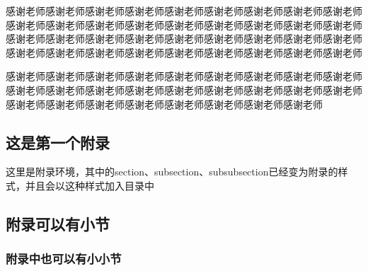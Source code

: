 \documentclass{HustGraduPaper}
\begin{document}
	\begin{thankpage}
		感谢老师感谢老师感谢老师感谢老师感谢老师感谢老师感谢老师感谢老师感谢老师感谢老师感谢老师感谢老师感谢老师感谢老师感谢老师感谢老师感谢老师感谢老师感谢老师感谢老师感谢老师感谢老师感谢老师感谢老师感谢老师感谢老师感谢老师感谢老师感谢老师感谢老师感谢老师感谢老师感谢老师感谢老师感谢老师感谢老师
		
		感谢老师感谢老师感谢老师感谢老师感谢老师感谢老师感谢老师感谢老师感谢老师感谢老师感谢老师感谢老师感谢老师感谢老师感谢老师感谢老师感谢老师感谢老师感谢老师感谢老师感谢老师感谢老师感谢老师感谢老师感谢老师感谢老师
	\end{thankpage}
	
	
	
	\begin{appendices}
		\section{这是第一个附录}
		这里是附录环境，其中的section、subsection、subsubsection已经变为附录的样式，并且会以这种样式加入目录中
		\subsection{附录可以有小节}
		\subsubsection{附录中也可以有小小节}
	\end{appendices}
	
\end{document}
